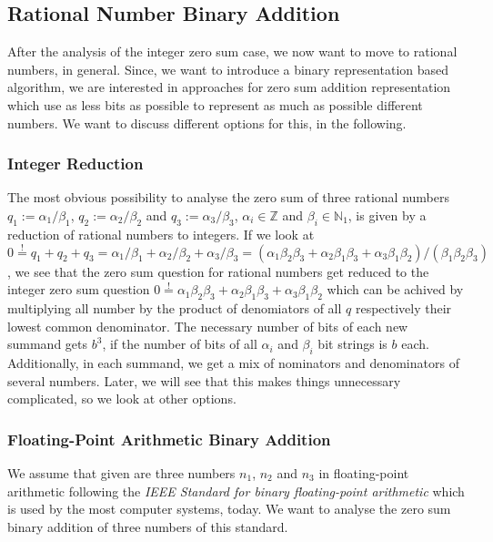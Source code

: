 \subsection{Rational Number Binary Addition}
\label{ss:rationalnumberbinaryaddition}
After the analysis of the integer zero sum case, we now want to move to rational numbers, in general. Since, we want to introduce a binary representation based algorithm, we are interested in approaches for zero sum addition representation which use as less bits as possible to represent as much as possible different numbers. We want to discuss different options for this, in the following.
\subsubsection{Integer Reduction}
\label{sss:integerreduction}
The most obvious possibility to analyse the zero sum of three rational numbers $q_{1} := \alpha_{1}/\beta_{1}$, $q_{2} := \alpha_{2}/\beta_{2}$ and $q_{3} := \alpha_{3}/\beta_{3}$, $\alpha_{i} \in \mathbb{Z}$ and $\beta_{i} \in \mathbb{N}_{1}$, is given by a reduction of rational numbers to integers. If we look at $0 \overset{!}{=} q_{1} + q_{2} + q_{3} = \alpha_{1}/\beta_{1} + \alpha_{2}/\beta_{2} + \alpha_{3}/\beta_{3} = \left(\alpha_{1}\beta_{2}\beta_{3} + \alpha_{2}\beta_{1}\beta_{3} + \alpha_{3}\beta_{1}\beta_{2}\right)/\left(\beta_{1}\beta_{2}\beta_{3}\right)$, we see that the zero sum question for rational numbers get reduced to the integer zero sum question $0 \overset{!}{=} \alpha_{1}\beta_{2}\beta_{3} + \alpha_{2}\beta_{1}\beta_{3} + \alpha_{3}\beta_{1}\beta_{2}$ which can be achived by multiplying all number by the product of denomiators of all $q$ respectively their lowest common denominator. The necessary number of bits of each new summand gets $b^3$, if the number of bits of all $\alpha_{i}$ and $\beta_{i}$ bit strings is $b$ each. Additionally, in each summand, we get a mix of nominators and denominators of several numbers. Later, we will see that this makes things unnecessary complicated, so we look at other options.
\subsubsection{Floating-Point Arithmetic Binary Addition}
\label{sss:floatingpointarithmeticbinaryaddition}
We assume that given are three numbers $n_{1}$, $n_{2}$ and $n_{3}$ in floating-point arithmetic following the \textit{IEEE Standard for binary floating-point arithmetic} \cite{30711} \cite{4610935} \cite{8766229} which is used by the most computer systems, today. We want to analyse the zero sum binary addition of three numbers of this standard.

